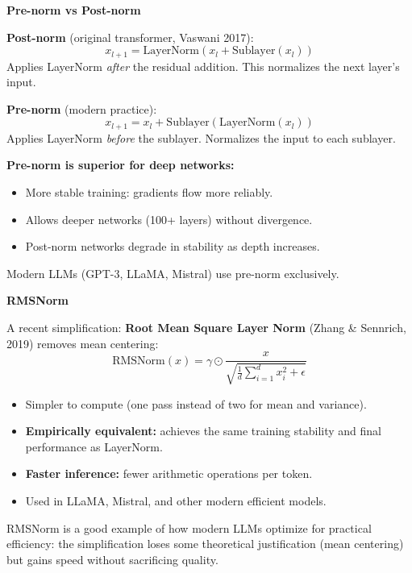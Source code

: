 \begin{notebox}
\textbf{Pre-norm vs Post-norm}

\textbf{Post-norm} (original transformer, Vaswani 2017):
\[
  x_{l+1} = \text{LayerNorm}(x_l + \text{Sublayer}(x_l))
\]
Applies LayerNorm \textit{after} the residual addition. This normalizes the next layer's input.

\textbf{Pre-norm} (modern practice):
\[
  x_{l+1} = x_l + \text{Sublayer}(\text{LayerNorm}(x_l))
\]
Applies LayerNorm \textit{before} the sublayer. Normalizes the input to each sublayer.

\begin{warnbox}
\textbf{Pre-norm is superior for deep networks:}
\begin{itemize}
  \item More stable training: gradients flow more reliably.
  \item Allows deeper networks (100+ layers) without divergence.
  \item Post-norm networks degrade in stability as depth increases.
\end{itemize}
Modern LLMs (GPT-3, LLaMA, Mistral) use pre-norm exclusively.
\end{warnbox}
\end{notebox}

\begin{notebox}
\textbf{RMSNorm}

A recent simplification: \textbf{Root Mean Square Layer Norm} (Zhang \& Sennrich, 2019) removes mean centering:
\[
  \text{RMSNorm}(x) = \gamma \odot \frac{x}{\sqrt{\frac{1}{d}\sum_{i=1}^d x_i^2 + \epsilon}}
\]

\begin{itemize}
  \item Simpler to compute (one pass instead of two for mean and variance).
  \item \textbf{Empirically equivalent:} achieves the same training stability and final performance as LayerNorm.
  \item \textbf{Faster inference:} fewer arithmetic operations per token.
  \item Used in LLaMA, Mistral, and other modern efficient models.
\end{itemize}

\begin{intuitionbox}
RMSNorm is a good example of how modern LLMs optimize for practical efficiency: the simplification loses some theoretical justification (mean centering) but gains speed without sacrificing quality.
\end{intuitionbox}
\end{notebox}

